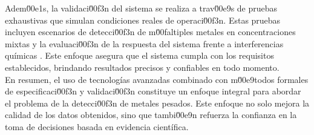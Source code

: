 Adem\u00e1s, la validaci\u00f3n del sistema se realiza a trav\u00e9s de pruebas exhaustivas que simulan condiciones reales de operaci\u00f3n. Estas pruebas incluyen escenarios de detecci\u00f3n de m\u00faltiples metales en concentraciones mixtas y la evaluaci\u00f3n de la respuesta del sistema frente a interferencias químicas \cite{rahimzadeh2017, ding2021}. Este enfoque asegura que el sistema cumpla con los requisitos establecidos, brindando resultados precisos y confiables en todo momento.\\

En resumen, el uso de tecnologías avanzadas combinado con m\u00e9todos formales de especificaci\u00f3n y validaci\u00f3n constituye un enfoque integral para abordar el problema de la detecci\u00f3n de metales pesados. Este enfoque no solo mejora la calidad de los datos obtenidos, sino que tambi\u00e9n refuerza la confianza en la toma de decisiones basada en evidencia científica.
